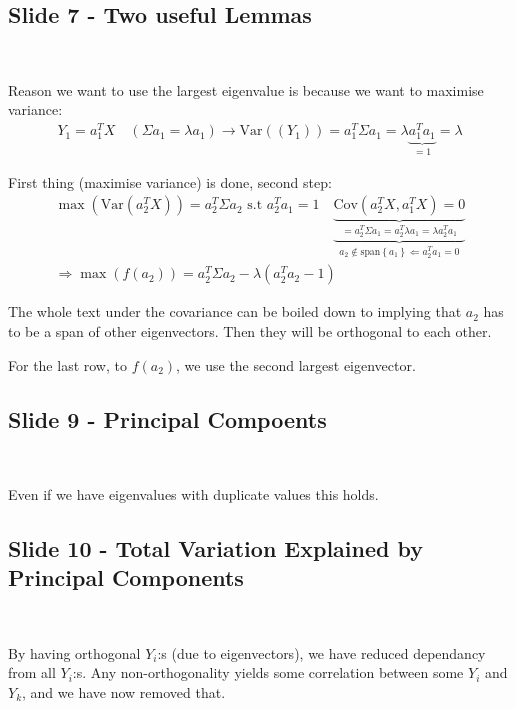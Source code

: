 \subsection{Slide 7 - Two useful Lemmas}\hfill\\\par
\noindent Reason we want to use the largest eigenvalue is because we want to maximise variance:
\begin{equation*}
  \begin{gathered}
    Y_1 = a_1^TX\quad (\Sigma a_1=\lambda a_1)\rightarrow \text{Var}\left((Y_1)\right) = a_1^T\Sigma a_1 = \lambda\underbrace{ a_1^Ta_1}_{\text{$=1$}} = \lambda
  \end{gathered}
\end{equation*}\par
\noindent First thing (maximise variance) is done, second step:
\begin{equation*}
  \begin{gathered}
    \max(\text{Var}\left(a_2^TX\right)) = a_2^T\Sigma a_2\text{ s.t } a_2^Ta_1 = 1\quad\underbrace{\underbrace{\text{Cov}\left(a_2^TX,a_1^TX\right) = 0}_{= a_2^T\Sigma a_1 = a_2^T\lambda a_1 = \lambda a_2^Ta_1}}_{a_2\not\in\text{span}\left\{a_1\right\}\Leftarrow a_2^Ta_1=0}\\
    \Rightarrow \max(f(a_2)) = a_2^T\Sigma a_2 -\lambda (a_2^Ta_2-1)
  \end{gathered}
\end{equation*}\par
\noindent The whole text under the covariance can be boiled down to implying that $a_2$ has to be a span of other eigenvectors. Then they will be orthogonal to each other. \par
\noindent For the last row, to $f(a_2)$, we use the second largest eigenvector.
\par\bigskip
\subsection{Slide 9 - Principal Compoents}\hfill\\\par
\noindent Even if we have eigenvalues with duplicate values this holds.
\par\bigskip
\subsection{Slide 10 - Total Variation Explained by Principal Components}\hfill\\\par
\noindent By having orthogonal $Y_i$:s (due to eigenvectors), we have reduced dependancy from all $Y_i$:s. Any non-orthogonality yields some correlation between some $Y_i$ and $Y_k$, and we have now removed that.
\par\bigskip
